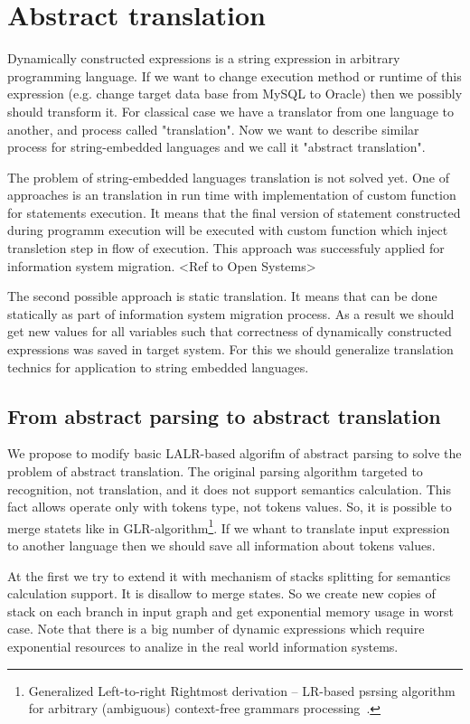 \documentclass{llncs}
\begin{document}
\section{Abstract translation}

Dynamically constructed expressions is a string expression in arbitrary programming language. If we want to change execution method or runtime of this expression (e.g. change target data base from MySQL to Oracle) then we possibly should transform it. For classical case we have a translator from one language to another, and process called "translation". Now we want to describe similar process for string-embedded languages and we call it "abstract translation".

The problem of string-embedded languages translation is not solved yet. One of approaches is an translation in run time with implementation of custom function for statements execution. It means that the final version of statement constructed during programm execution will be executed with custom function which inject transletion step in flow of execution. This approach was successfuly applied for information system migration. <Ref to Open Systems>

The second possible approach is static translation. It means that can be done statically as part of information system migration process. As a result we should get new values for all variables such that correctness of dynamically constructed expressions was saved in target system. For this we should generalize translation technics for application to string embedded languages.

\subsection{From abstract parsing to abstract translation}

We propose to modify basic LALR-based algorifm of abstract parsing to solve the problem of abstract translation. The original parsing algorithm targeted to recognition, not translation, and it does not support semantics calculation. This fact allows operate only with tokens type, not tokens values. So, it is possible to merge statets like in GLR-algorithm\footnote{Generalized Left-to-right Rightmost derivation -- LR-based psrsing algorithm for arbitrary (ambiguous) context-free grammars processing~\cite{Grune}.}. If we whant to translate input expression to another language then we should save all information about tokens values. 

At the first we try to extend it with mechanism of stacks splitting for semantics calculation support. It is disallow to merge states. So we create new copies of stack on each branch in input graph and get exponential memory usage in worst case. Note that there is a big number of dynamic expressions which require exponential resources to analize in the real world information systems. 
\end{document}
